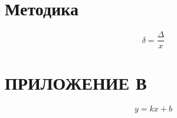 \section{Методика}

\begin{equation}
  \delta = \frac{\Delta}{x}
\end{equation}

\section*{ПРИЛОЖЕНИЕ В}

\begin{equation} %
  y = kx + b
\end{equation}
